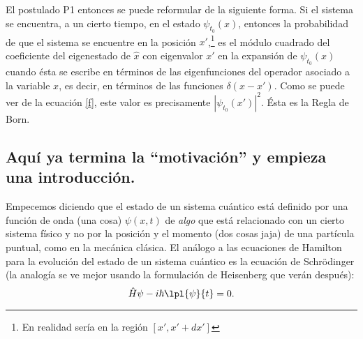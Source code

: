 \documentclass[10pt,letterpaper]{article}
\begin{document}
El postulado P1 entonces se puede reformular de la siguiente forma. Si el sistema se encuentra, a un cierto tiempo, en el estado $\psi_{t_0}(x)$, entonces la probabilidad de que el sistema se encuentre en la posición $x'$,\footnote{En realidad sería en la región $[x',x'+dx']$} es el módulo cuadrado del coeficiente del eigenestado de $\hat{x}$ con eigenvalor $x'$ en la expansión de $\psi_{t_0}(x)$ cuando ésta se escribe en términos de las eigenfunciones del operador asociado a la variable $x$, es decir, en términos de las funciones $\delta(x-x')$. Como se puede ver de la ecuación \eqref{f}, este valor es precisamente $|\psi_{t_0}(x')|^2$. Ésta es la Regla de Born.
 
\subsection*{Aquí ya termina la ``motivación'' y empieza una introducción.}

Empecemos diciendo que el estado de un sistema cuántico está definido por una función de onda (una cosa) $\psi(x,t)$ de \emph{algo} que está relacionado con un cierto sistema físico y no por la posición y el momento (dos cosas jaja) de una partícula puntual, como en la mecánica clásica. El análogo a las ecuaciones de Hamilton para la evolución del estado de un sistema cuántico es la ecuación de Schrödinger (la analogía se ve mejor usando la formulación de Heisenberg que verán después):
\begin{equation}
\hat{H}\psi - i\hbar\lpl{\psi}{t} = 0.\label{sch}
\end{equation}
\end{document}
